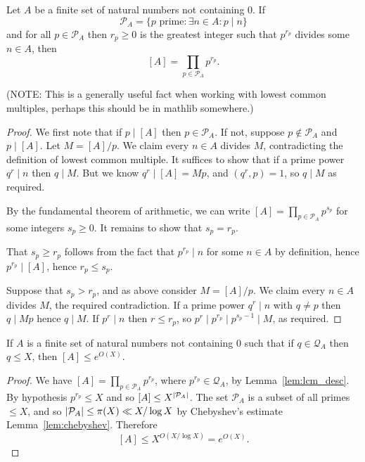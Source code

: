 \begin{lemma}\label{lem:lcm_desc}
  \leanok
Let $A$ be a finite set of natural numbers not containing $0$. If
\[\mathcal{P}_A = \{ p \textrm{ prime}: \exists n\in A : p \mid n\}\]
and for all $p\in \mathcal{P}_A$ then $r_p\geq 0$ is the greatest integer such that $p^{r_p}$ divides some $n\in A$, then
\[[A]=\prod_{p\in\mathcal{P}_A}p^{r_p}.\]
\end{lemma}
(NOTE: This is a generally useful fact when working with lowest common multiples, perhaps this should be in mathlib somewhere.)
\begin{proof}
  \leanok
We first note that if $p\mid [A]$ then $p\in \mathcal{P}_A$. If not, suppose $p\not\in\mathcal{P}_A$ and $p\mid [A]$. Let $M=[A]/p$. We claim every $n\in A$ divides $M$, contradicting the definition of lowest common multiple. It suffices to show that if a prime power $q^r\mid n$ then $q\mid M$. But we know $q^r\mid [A]=Mp$, and $(q^r,p)=1$, so $q\mid M$ as required.

By the fundamental theorem of arithmetic, we can write $[A] = \prod_{p\in \mathcal{P}_A}p^{s_p}$ for some integers $s_p\geq 0$. It remains to show that $s_p=r_p$.

That $s_p\geq r_p$ follows from the fact that $p^{r_p}\mid n$ for some $n\in A$ by definition, hence $p^{r_p}\mid [A]$, hence $r_p\leq s_p$.

Suppose that $s_p>r_p$, and as above consider $M=[A]/p$. We claim every $n\in A$ divides $M$, the required contradiction. If a prime power $q^r\mid n$ with $q\neq p$ then $q\mid Mp$ hence $q\mid M$. If $p^r\mid n$ then $r\leq r_p$, so $p^r\mid p^{r_p}\mid p^{s_p-1}\mid M$, as required.
\end{proof}

\begin{lemma}\label{lem:smooth_lcm}
  \leanok
If $A$ is a finite set of natural numbers not containing $0$ such that if $q\in\mathcal{Q}_A$ then $q\leq X$, then $[A]\leq e^{O(X)}$.
\end{lemma}
\begin{proof}
  \leanok
  We have $[A]=\prod_{p\in\mathcal{P}_A}p^{r_p}$, where $p^{r_p}\in \mathcal{Q}_A$, by Lemma~\ref{lem:lcm_desc}. By hypothesis $p^{r_p}\leq X$ and so $[A]\leq X^{\left\lvert \mathcal{P}_A\right\rvert}$. The set $\mathcal{P}_A$ is a subset of all primes $\leq X$, and so $\left\lvert \mathcal{P}_A\right\rvert\leq \pi(X)\ll X/\log X$ by Chebyshev's estimate Lemma~\ref{lem:chebyshev}. Therefore
  \[[A]\leq X^{O(X/\log X)}=e^{O(X)}.\]
\end{proof}

